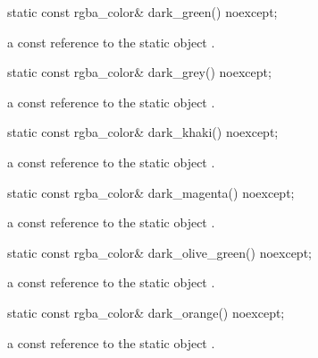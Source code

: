 \begin{itemdecl}
static const rgba_color& dark_green() noexcept;
\end{itemdecl}
\begin{itemdescr}
\pnum
\returns
a const reference to the static  object .
\end{itemdescr}

\begin{itemdecl}
static const rgba_color& dark_grey() noexcept;
\end{itemdecl}
\begin{itemdescr}
\pnum
\returns
a const reference to the static  object .
\end{itemdescr}

\begin{itemdecl}
static const rgba_color& dark_khaki() noexcept;
\end{itemdecl}
\begin{itemdescr}
\pnum
\returns
a const reference to the static  object .
\end{itemdescr}

\begin{itemdecl}
static const rgba_color& dark_magenta() noexcept;
\end{itemdecl}
\begin{itemdescr}
\pnum
\returns
a const reference to the static  object .
\end{itemdescr}

\begin{itemdecl}
static const rgba_color& dark_olive_green() noexcept;
\end{itemdecl}
\begin{itemdescr}
\pnum
\returns
a const reference to the static  object .
\end{itemdescr}

\begin{itemdecl}
static const rgba_color& dark_orange() noexcept;
\end{itemdecl}
\begin{itemdescr}
\pnum
\returns
a const reference to the static  object .
\end{itemdescr}

